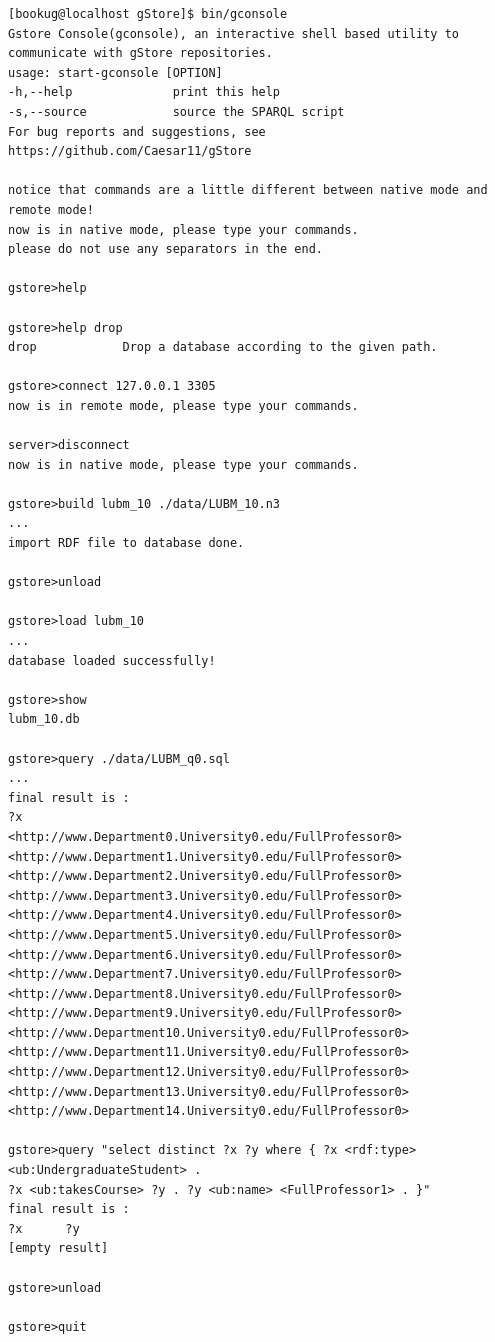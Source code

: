 \documentclass[titlepage, a4paper, 12pt]{article}
\begin{document}
\begin{verbatim}
[bookug@localhost gStore]$ bin/gconsole
Gstore Console(gconsole), an interactive shell based utility to communicate with gStore repositories.
usage: start-gconsole [OPTION]
-h,--help              print this help
-s,--source            source the SPARQL script
For bug reports and suggestions, see https://github.com/Caesar11/gStore

notice that commands are a little different between native mode and remote mode!
now is in native mode, please type your commands.
please do not use any separators in the end.

gstore>help

gstore>help drop
drop            Drop a database according to the given path.

gstore>connect 127.0.0.1 3305
now is in remote mode, please type your commands.

server>disconnect
now is in native mode, please type your commands.

gstore>build lubm_10 ./data/LUBM_10.n3
...
import RDF file to database done.

gstore>unload

gstore>load lubm_10
...
database loaded successfully!

gstore>show
lubm_10.db

gstore>query ./data/LUBM_q0.sql
...
final result is :
?x
<http://www.Department0.University0.edu/FullProfessor0>
<http://www.Department1.University0.edu/FullProfessor0>
<http://www.Department2.University0.edu/FullProfessor0>
<http://www.Department3.University0.edu/FullProfessor0>
<http://www.Department4.University0.edu/FullProfessor0>
<http://www.Department5.University0.edu/FullProfessor0>
<http://www.Department6.University0.edu/FullProfessor0>
<http://www.Department7.University0.edu/FullProfessor0>
<http://www.Department8.University0.edu/FullProfessor0>
<http://www.Department9.University0.edu/FullProfessor0>
<http://www.Department10.University0.edu/FullProfessor0>
<http://www.Department11.University0.edu/FullProfessor0>
<http://www.Department12.University0.edu/FullProfessor0>
<http://www.Department13.University0.edu/FullProfessor0>
<http://www.Department14.University0.edu/FullProfessor0>

gstore>query "select distinct ?x ?y where { ?x <rdf:type>
<ub:UndergraduateStudent> .
?x <ub:takesCourse> ?y . ?y <ub:name> <FullProfessor1> . }"
final result is :
?x      ?y
[empty result]

gstore>unload

gstore>quit
\end{verbatim}
\end{document}

